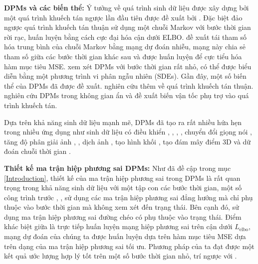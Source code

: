 \documentclass[14pt, a4paper]{article}
\numberwithin{equation}{section}
\numberwithin{figure}{section}
\numberwithin{dl}{section}
\numberwithin{md}{section}
\numberwithin{bd}{section}
\numberwithin{dn}{section}
\numberwithin{hq}{section}
\begin{document}
    \textbf{DPMs và các biến thể:} Ý tưởng về quá trình sinh dữ liệu được xây dựng bởi một quá trình khuếch tán ngược lần đầu tiên được đề xuất bởi \cite{sohl2015deep}.
    Đặc biệt \cite{sohl2015deep} đảo ngược quá trình khuếch tán thuận sử dụng một chuỗi Markov với bước thời gian rời rạc, huấn luyện bằng cách cực đại hóa cận dưới ELBO.
    \cite{ho2020denoising} đề xuất tái tham số hóa trung bình của chuỗi Markov bằng mạng dự đoán nhiễu, mạng này chia sẻ tham số giữa các bước thời gian khác sau và được huấn luyện để cực tiểu hóa hàm mục tiêu MSE.
    \cite{song2020score} xem xét DPMs với bước thời gian rất nhỏ, có thể được biểu diễn bằng một phương trình vi phân ngẫu nhiên (SDEs).
    Gần đây, một số biến thể của DPMs đã được đề xuất. \cite{kingma2021variational} nghiên cứu thêm về quá trình khuếch tán thuận.
    \cite{vahdat2021score} nghiên cứu DPMs trong không gian ẩn và \cite{dockhorn2021score} đề xuất biến vận tốc phụ trợ vào quá trình khuếch tán.

    Dựa trên khả năng sinh dữ liệu mạnh mẽ, DPMs đã tạo ra rất nhiều hứa hẹn trong nhiều ứng dụng như sinh dữ liệu có điều khiển \cite{choi2021ilvr}, \cite{meng2021sdedit}, \cite{sinha2021d2c}, \cite{nichol2021glide},
    chuyển đổi giọng nói \cite{popov2021diffusion}, tăng độ phân giải ảnh \cite{saharia2021image}, \cite{li2022srdiff}, dịch ảnh \cite{sasaki2021unit}, tạo hình khối \cite{zhou20213d},
    tạo đám mây điểm 3D \cite{luo2021diffusion} và dữ đoán chuỗi thời gian \cite{rasul2021autoregressive}.

    \textbf{Thiết kế ma trận hiệp phương sai DPMs:} Như đã đề cập trong mục \ref{Introduction}, thiết kế của ma trận hiệp phương sai trong DPMs là rất quan trọng trong khả năng sinh dữ liệu với một tập con các bước thời gian,
    một số công trình trước \cite{ho2020denoising}, \cite{song2020denoising}, \cite{bao2021analytic} sử dụng các ma trận hiệp phương sai đẳng hướng mà chỉ phụ thuộc vào bước thời gian mà không xem xét đến trạng thái.
    Bên cạnh đó, \cite{nichol2021improved} sử dụng ma trận hiệp phương sai đường chéo có phụ thuộc vào trạng thái.
    Điểm khác biệt giữa \cite{nichol2021improved} là trực tiếp huấn luyện mạng hiệp phương sai trên cận dưới $L_{\mathrm{elbo}}$,
    mạng dự đoán của chúng ta được huấn luyện dựa trên hàm mục tiêu MSE dựa trên dạng của ma trận hiệp phương sai tối ưu.
    Phương pháp của ta đạt được một kết quả ước lượng hợp lý tốt trên một số bước thời gian nhỏ, trí ngược với \cite{nichol2021improved}.
\end{document}
